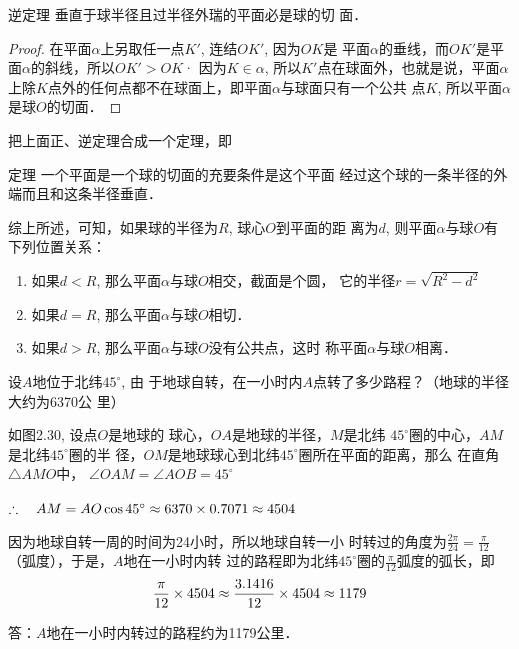 \begin{blk}
  {逆定理} 垂直于球半径且过半径外瑞的平面必是球的切
面．  
\end{blk}

\begin{proof}
在平面$\alpha$上另取任一点$K'$, 连结$OK'$, 因为$OK$是
平面$\alpha$的垂线，而$OK'$是平面$\alpha$的斜线，所以$OK'>OK$· 
因为$K\in\alpha$, 所以$K'$点在球面外，也就是说，平面$\alpha$上除$K$点外的任何点都不在球面上，即平面$\alpha$与球面只有一个公共
点$K$, 所以平面$\alpha$是球$O$的切面．
\end{proof}

把上面正、逆定理合成一个定理，即

\begin{blk}
    {定理} 一个平面是一个球的切面的充要条件是这个平面
经过这个球的一条半径的外端而且和这条半径垂直．
\end{blk}

综上所述，可知，如果球的半径为$R$, 球心$O$到平面的距
离为$d$, 则平面$\alpha$与球$O$有下列位置关系：
\begin{enumerate}
\item 如果$d<R$, 那么平面$\alpha$与球$O$相交，截面是个圆，
它的半径$r=\sqrt{R^2-d^2}$
\item 如果$d=R$, 那么平面$\alpha$与球$O$相切．
\item 如果$d>R$, 那么平面$\alpha$与球$O$没有公共点，这时
称平面$\alpha$与球$O$相离．
\end{enumerate}

\begin{example}
    设$A$地位于北纬$45^{\circ}$, 由
于地球自转，在一小时内$A$点转了多少路程？（地球的半径大约为6370公
里）
\end{example}


\begin{solution}
    如图2.30, 设点$O$是地球的
    球心，$OA$是地球的半径，$M$是北纬
    $45^{\circ}$圈的中心，$AM$是北纬$45^{\circ}$圈的半
    径，$OM$是地球球心到北纬$45^{\circ}$圈所在平面的距离，那么
在直角$\triangle AMO$中，
$\angle OAM=\angle AOB=45^{\circ}$

$\therefore\quad AM=AO\cos45^{\circ}\approx 6370\times0.7071\approx 4504$

因为地球自转一周的时间为24小时，所以地球自转一小
时转过的角度为$\frac{2\pi}{24}=\frac{\pi}{12}$（弧度），于是，$A$地在一小时内转
过的路程即为北纬$45^{\circ}$圈的$\frac{\pi}{12}$弧度的弧长，即
\[\dfrac{\pi}{12}\times 4504\approx \dfrac{3.1416}{12}\times 4504\approx 1179\]

答：$A$地在一小时内转过的路程约为1179公里．
\end{solution}

